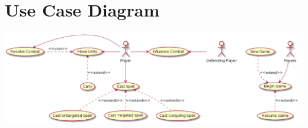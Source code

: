 \documentclass{article}
\newenvironment{al}
{\begin{description}[leftmargin=!,labelwidth=\widthof{\bfseries Preconditions:}]}
{\end{description}}
\newcounter{twocoli}
\newenvironment{twocol}
{ \setcounter{twocoli}{1}
  \begin{tabular}{ p{0.45\textwidth} p{0.43\textwidth}} }
{ \end{tabular} }
\newcommand{\tabrow}[2]
{   \arabic{twocoli}. \  \parbox[t]{0.40\textwidth}{#1 \vspace{0.1 in}} \stepcounter{twocoli} 
  & \arabic{twocoli}. \  \parbox[t]{0.47\textwidth}{#2 \vspace{0.1 in}} \stepcounter{twocoli}\\}
\newcommand{\tableft}[1]
{   \arabic{twocoli}. \  \parbox[t]{0.40\textwidth}{#1 \vspace{0.1 in}} & \parbox[t]{0.47\textwidth}{ \vspace{0.1 in}} \stepcounter{twocoli}\\}
\begin{document}
\section*{Use Case Diagram}
\includegraphics{use_cases.png}

\tableofcontents

\end{document}
